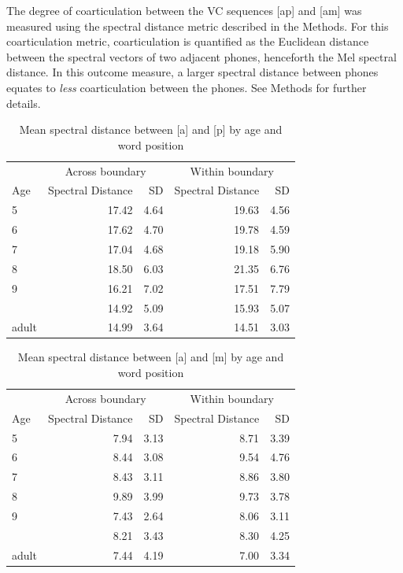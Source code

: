 \documentclass[a4paper,man,floatsintext,natbib,donotrepeattitle, apacite]{apa6}
\begin{document}
The degree of coarticulation between the VC sequences {[}ap{]} and {[}am{]} was measured using the spectral distance metric described in the Methods. For this coarticulation metric, coarticulation is quantified as the Euclidean distance between the spectral vectors of two adjacent phones, henceforth the Mel spectral distance. In this outcome measure, a larger spectral distance between phones equates to \emph{less} coarticulation between the phones. See Methods for further details. 

\begin{table}[H]

\caption{\label{tab:ap-coartic-tbl}Mean spectral distance between [a] and [p] by age and word position}
\centering
\begin{tabular}[t]{lrrrr}
\toprule
\multicolumn{1}{c}{ } & \multicolumn{2}{c}{Across boundary} & \multicolumn{2}{c}{Within boundary} \\
\cmidrule(l{3pt}r{3pt}){2-3} \cmidrule(l{3pt}r{3pt}){4-5}
Age & Spectral Distance  & SD  & Spectral Distance & SD\\
\midrule
5 & 17.42 & 4.64 & 19.63 & 4.56\\
6 & 17.62 & 4.70 & 19.78 & 4.59\\
7 & 17.04 & 4.68 & 19.18 & 5.90\\
8 & 18.50 & 6.03 & 21.35 & 6.76\\
9 & 16.21 & 7.02 & 17.51 & 7.79\\
\addlinespace
10 & 14.92 & 5.09 & 15.93 & 5.07\\
adult & 14.99 & 3.64 & 14.51 & 3.03\\
\bottomrule
\end{tabular}
\end{table}

\begin{table}[H]

\caption{\label{tab:am-coartic-tbl}Mean spectral distance between [a] and [m] by age and word position}
\centering
\begin{tabular}[t]{lrrrr}
\toprule
\multicolumn{1}{c}{ } & \multicolumn{2}{c}{Across boundary} & \multicolumn{2}{c}{Within boundary} \\
\cmidrule(l{3pt}r{3pt}){2-3} \cmidrule(l{3pt}r{3pt}){4-5}
Age & Spectral Distance  & SD  & Spectral Distance & SD\\
\midrule
5 & 7.94 & 3.13 & 8.71 & 3.39\\
6 & 8.44 & 3.08 & 9.54 & 4.76\\
7 & 8.43 & 3.11 & 8.86 & 3.80\\
8 & 9.89 & 3.99 & 9.73 & 3.78\\
9 & 7.43 & 2.64 & 8.06 & 3.11\\
\addlinespace
10 & 8.21 & 3.43 & 8.30 & 4.25\\
adult & 7.44 & 4.19 & 7.00 & 3.34\\
\bottomrule
\end{tabular}
\end{table}
\end{document}
